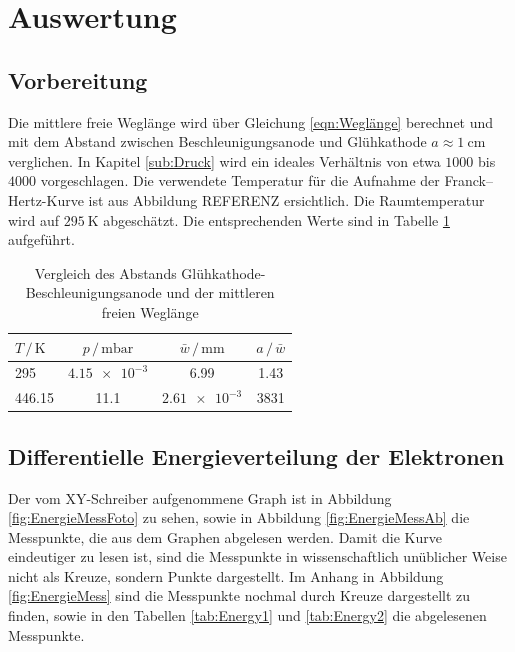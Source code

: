 \section{Auswertung}
\label{sec:Auswertung}

\subsection{Vorbereitung}

Die mittlere freie Weglänge wird über Gleichung \eqref{eqn:Weglänge} berechnet und mit dem Abstand zwischen Beschleunigungsanode 
und Glühkathode $a\approx \SI{1}{\centi\meter}$ verglichen. In Kapitel \ref{sub:Druck} wird ein ideales Verhältnis von etwa $1000$ bis $4000$ vorgeschlagen. 
Die verwendete Temperatur für die Aufnahme der Franck--Hertz-Kurve ist aus Abbildung REFERENZ ersichtlich. 
Die Raumtemperatur wird auf $\SI{295}{\kelvin}$ abgeschätzt.
Die entsprechenden Werte sind in Tabelle \ref{tab:Weglänge} aufgeführt. 

\begin{table}
    \centering
    \caption{Vergleich des Abstands Glühkathode-Beschleunigungsanode und der mittleren freien Weglänge}
    \label{tab:Weglänge}
    \begin{tabular}{l c c c}
        \toprule
        $T\,/\,\si{\kelvin}$ & $p\,/\,\si{\milli\bar}$ & $\bar{w}\,/\,\si{\milli\meter}$ & $a\,/\,\bar{w}$ \\
        \midrule
        295    & $\num{4.15e-3}$ &  6.99            & 1.43 \\
        446.15 & 11.1            & $\num{2.61e-3}$  & 3831 \\
        \bottomrule
    \end{tabular}
\end{table}

\subsection{Differentielle Energieverteilung der Elektronen}

Der vom XY-Schreiber aufgenommene Graph ist in Abbildung \ref{fig:EnergieMessFoto} zu sehen, sowie in Abbildung \ref{fig:EnergieMessAb} die Messpunkte, die aus dem Graphen abgelesen werden. 
Damit die Kurve eindeutiger zu lesen ist, sind die Messpunkte in wissenschaftlich unüblicher Weise nicht als Kreuze, sondern Punkte dargestellt. 
Im Anhang in Abbildung \ref{fig:EnergieMess} sind die Messpunkte nochmal durch Kreuze dargestellt zu finden, sowie in den Tabellen \ref{tab:Energy1} und 
\ref{tab:Energy2} die abgelesenen Messpunkte. 

